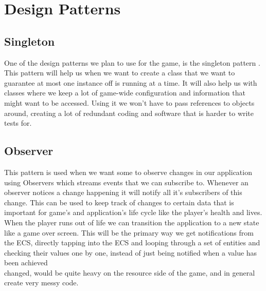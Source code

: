 \section{Design Patterns}

\subsection{Singleton}
One of the design patterns we plan to use for the game, is the singleton pattern \cite{wiki:singleton}. This pattern will help us when we want to create a class that we want to guarantee at most one instance off is running at a time. It will also help us with classes where we keep a lot of game-wide configuration and information that might want to be accessed. Using it we won't have to pass references to objects around, creating a lot of redundant coding and software that is harder to write tests for.

\subsection{Observer}
This pattern is used when we want some to observe changes in our application using Observers\cite{wiki:observer} which streams events that we can subscribe to. Whenever an observer notices a change happening it will notify all it's subscribers of this change. This can be used to keep track of changes to certain data that is important for game's and application's life cycle like the player's health and lives. When the player runs out of life we can transition the application to a new state like a game over screen. This will be the primary way we get notifications from the ECS, directly tapping into the ECS and looping through a set of entities and checking their values one by one, instead of just being notified when a value has been achieved\\changed, would be quite heavy on the resource side of the game, and in general create very messy code.
